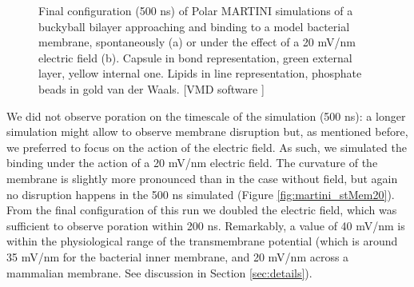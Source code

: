 \begin{figure}[t!]
\centering
{}
\caption[Bacterial membrane and buckyball bilayer (MARTINI simulations)]{Final configuration (500 ns) of Polar MARTINI simulations of a buckyball bilayer approaching and binding to a model bacterial membrane, spontaneously (a) or under the effect of a 20 mV/nm electric field (b). Capsule in bond representation, green external layer, yellow internal one. Lipids in line representation, phosphate beads in gold van der Waals. [VMD software \citet{HUMP96}]}
\label{fig:martini_stMem}
\end{figure}

We did not observe poration on the timescale of the simulation (500 ns): a longer simulation might allow to observe membrane disruption but, as mentioned before, we preferred to focus on the action of the electric field. As such, we simulated the binding under the action of a 20 mV/nm electric field. The curvature of the membrane is slightly more pronounced than in the case without field, but again no disruption happens in the 500 ns simulated (Figure \ref{fig:martini_stMem20}).
From the final configuration of this run we doubled the electric field, which was sufficient to observe poration within 200 ns.
%
Remarkably, a value of 40 mV/nm is within the physiological range of the transmembrane potential (which is around 35 mV/nm for the bacterial inner membrane, and 20 mV/nm across a mammalian membrane. See discussion in Section \ref{sec:details}).

